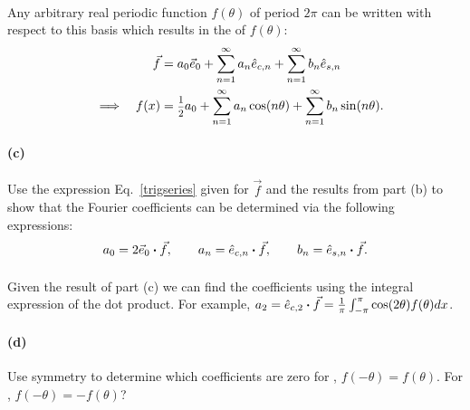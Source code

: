 \documentclass{article}
\begin{document}
\phline
\paragraph{}
Any arbitrary real periodic function $f(\theta)$ of period $2\pi$ can be written with respect to this basis which results in the  of $f(\theta)$:
	\begin{align}
		\vec{f} &= a_{0}\vec{e}_{0} + \sum_{n=1}^{\infty}a_{n}\hat{e}_{c,n} + \sum_{n=1}^{\infty}b_{n}\hat{e}_{s,n}		\label{trigseries}\\	\eqimplies
		f(x) &=\fracsm{1}{2}a_{0} + \sum_{n=1}^{\infty} a_{n}\cos(n\theta) + \sum_{n=1}^{\infty} b_{n}\sin(n\theta).
	\label{trigexpansion}
	\end{align}

\paragraph{(c)}		\extrapart
Use the expression Eq.~\ref{trigseries} given for $\vec{f}$ and the results from part (b) to show that the Fourier coefficients can be determined via the following expressions:
	\begin{equation*}
		a_{0} = 2\vec{e}_{0}\boldsymbol{\cdot}\vec{f},	\qquad	a_{n} = \hat{e}_{c,n}\boldsymbol{\cdot}{\vec{f}},		\qquad b_{n} = \hat{e}_{s,n} \boldsymbol{\cdot}\vec{f}.
	\end{equation*}

\phline
\paragraph{}
Given the result of part (c) we can find the coefficients using the integral expression of the dot product.  For example, 
$a_{2} = \hat{e}_{c,2}\boldsymbol{\cdot}{\vec{f}} = \frac{1}{\pi}\int_{-\pi}^{\pi} \cos(2\theta)f(\theta)dx$.

\paragraph{(d)}
Use symmetry to determine which coefficients are zero for , $f(-\theta) = f(\theta)$.  For , $f(-\theta) = -f(\theta)$?
\end{document}
